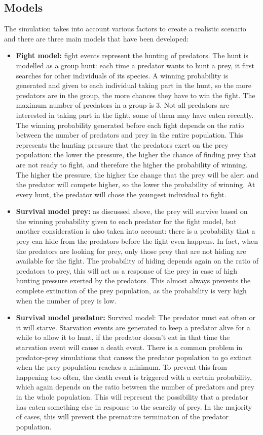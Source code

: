 \documentclass[conference]{IEEEtran}
\begin{document}
\subsection{Models}

    The simulation takes into account various factors to create a realistic scenario and there are three main models that have been developed:

    \begin{itemize}
        \item \textbf{Fight model:} fight events represent the hunting of predators. The hunt is modelled as a group hunt: each time a predator wants to hunt a prey, it first searches for other individuals of its species. A winning probability is generated and given to each individual taking part in the hunt, so the more predators are in the group, the more chances they have to win the fight. The maximum number of predators in a group is 3. Not all predators are interested in taking part in the fight, some of them may have eaten recently. The winning probability generated before each fight depends on the ratio between the number of predators and prey in the entire population. This represents the hunting pressure that the predators exert on the prey population: the lower the pressure, the higher the chance of finding prey that are not ready to fight, and therefore the higher the probability of winning. The higher the pressure, the higher the change that the prey will be alert and the predator will compete higher, so the lower the probability of winning. At every hunt, the predator will chose the youngest individual to fight.
        \item \textbf{Survival model prey:} as discussed above, the prey will survive based on the winning probability given to each predator for the fight model, but another consideration is also taken into account: there is a probability that a prey can hide from the predators before the fight even happens. In fact, when the predators are looking for prey, only those prey that are not hiding are available for the fight. The probability of hiding depends again on the ratio of predators to prey, this will act as a response of the prey in case of high hunting pressure exerted by the predators. This almost always prevents the complete extinction of the prey population, as the probability is very high when the number of prey is low. 
        \item \textbf{Survival model predator:} Survival model: The predator must eat often or it will starve. Starvation events are generated to keep a predator alive for a while to allow it to hunt, if the predator doesn't eat in that time the starvation event will cause a death event. There is a common problem in predator-prey simulations that causes the predator population to go extinct when the prey population reaches a minimum. To prevent this from happening too often, the death event is triggered with a certain probability, which again depends on the ratio between the number of predators and prey in the whole population. This will represent the possibility that a predator has eaten something else in response to the scarcity of prey. In the majority of cases, this will prevent the premature termination of the predator population.

\end{itemize}
\end{document}
